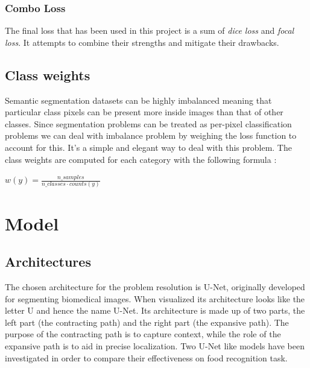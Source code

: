 \documentclass[a4paper,10pt]{report}
\begin{document}
\subsection{Combo Loss}\label{subsec:subsection-363}
The final loss that has been used in this project is a sum of \textit{dice loss} and \textit{focal loss}. It attempts to combine their strengths and mitigate their drawbacks.

\section{Class weights}\label{sec:section-37}
Semantic segmentation datasets can be highly imbalanced meaning that particular class pixels can be present more inside images than that of other classes. Since segmentation problems can be treated as per-pixel classification problems we can deal with imbalance problem by weighing the loss function to account for this. It's a simple and elegant way to deal with this problem. 
The class weights are computed for each category with the following formula \cite{class_weights}:
\begin{center}
    $w(y) = \frac{n\_samples}{n\_classes \cdot counts(y)}$
\end{center}



\chapter{Model}\label{chap:chapter-4}

\section{Architectures}\label{sec:section-41}
The chosen architecture for the problem resolution is U-Net, originally developed for segmenting biomedical images. When visualized its architecture looks like the letter U and hence the name U-Net. Its architecture is made up of two parts, the left part (the contracting path) and the right part (the expansive path). The purpose of the contracting path is to capture context, while the role of the expansive path is to aid in precise localization.
Two U-Net like models have been investigated in order to compare their effectiveness on food recognition task.
\end{document}
